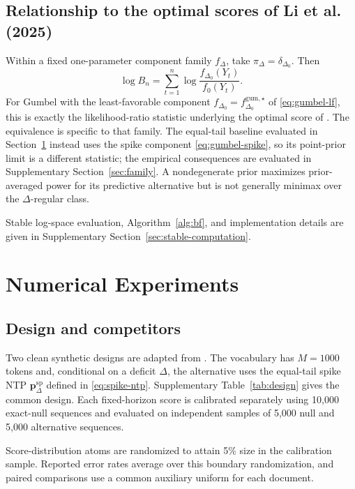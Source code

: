\documentclass[11pt]{article}
\newcommand{\bP}{\bm p}
\begin{document}
\subsection{Relationship to the optimal scores of Li et al. (2025)}

Within a fixed one-parameter component family $f_\Delta$, take $\pi_\Delta=\delta_{\Delta_0}$.  Then
\begin{equation}
  \log B_n=\sum_{t=1}^n
  \log\frac{f_{\Delta_0}(Y_t)}{f_0(Y_t)}.
\end{equation}
For Gumbel with the least-favorable component $f_{\Delta_0}=f_{\Delta_0}^{\mathrm{gum},\star}$ of \eqref{eq:gumbel-lf}, this is exactly the likelihood-ratio statistic underlying the optimal score of \citet{li2025framework}.  The equivalence is specific to that family.  The equal-tail baseline evaluated in Section~\ref{sec:experiments} instead uses the spike component \eqref{eq:gumbel-spike}, so its point-prior limit is a different statistic; the empirical consequences are evaluated in Supplementary Section~\ref{sec:family}.  A nondegenerate prior maximizes prior-averaged power for its predictive alternative but is not generally minimax over the $\Delta$-regular class.

Stable log-space evaluation, Algorithm~\ref{alg:bf}, and implementation details are given in Supplementary Section~\ref{sec:stable-computation}.

\section{Numerical Experiments}
\label{sec:experiments}

\subsection{Design and competitors}

Two clean synthetic designs are adapted from \citet{li2025framework}.  The vocabulary has $M=1000$ tokens and, conditional on a deficit $\Delta$, the alternative uses the equal-tail spike NTP $\bP_\Delta^{\mathrm{sp}}$ defined in \eqref{eq:spike-ntp}.  Supplementary Table~\ref{tab:design} gives the common design.  Each fixed-horizon score is calibrated separately using 10,000 exact-null sequences and evaluated on independent samples of 5,000 null and 5,000 alternative sequences.

Score-distribution atoms are randomized to attain 5\% size in the calibration sample.  Reported error rates average over this boundary randomization, and paired comparisons use a common auxiliary uniform for each document.
\end{document}
